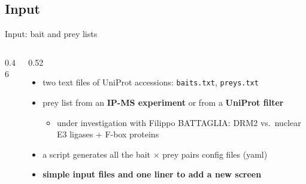 \documentclass[aspectratio=169]{beamer}
\newcommand{\currentsubsectionname}{}
\let\origsubsection\subsection
\renewcommand{\subsection}[1]{\origsubsection{#1}\gdef\currentsubsectionname{#1}}
\begin{document}
\subsection{Input}
\begin{frame}{Input: bait and prey lists}
  \begin{columns}[c]
    \begin{column}{0.46\textwidth}
      \centering
    \end{column}
    \begin{column}{0.52\textwidth}
      \begin{itemize}\small
        \item two text files of UniProt accessions: \texttt{baits.txt}, \texttt{preys.txt}
        \item prey list from an \textbf{IP-MS experiment} or from a \textbf{UniProt filter}
          \begin{itemize}\footnotesize
            \item under investigation with Filippo BATTAGLIA: DRM2 vs.\ nuclear E3 ligases + F-box proteins
          \end{itemize}
        \item a script generates all the bait $\times$ prey pairs config files (yaml)
        \item[$\Rightarrow$] \textcolor{substrate}{\textbf{simple input files and one liner to add a new screen}}
      \end{itemize}
    \end{column}
  \end{columns}
\end{frame}
\end{document}
